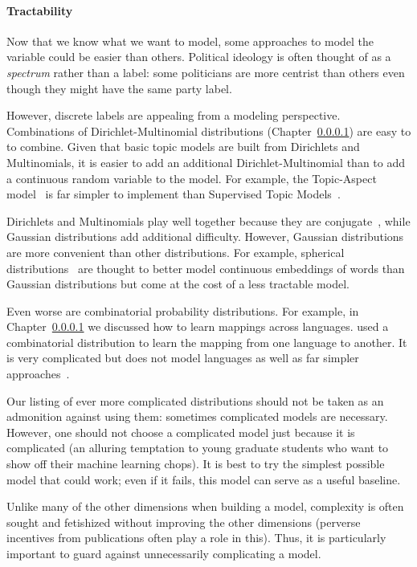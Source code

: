 \paragraph{Tractability}

Now that we know what we want to model, some approaches to model the
variable could be easier than others.  Political ideology is often
thought of as a \emph{spectrum} rather than a label: some politicians
are more centrist than others even though they might have the same
party label.

However, discrete labels are appealing from a modeling perspective.
Combinations of Dirichlet-Multinomial distributions (Chapter~\ref{})
are easy to to combine.  Given that basic topic models are built from
Dirichlets and Multinomials, it is easier to add an additional
Dirichlet-Multinomial than to add a continuous random variable to the
model.  For example, the Topic-Aspect model~\citep{} is far simpler to
implement than Supervised Topic Models~\citep{}.

Dirichlets and Multinomials play well together because they are
conjugate~\citep{}, while Gaussian distributions add additional
difficulty.  However, Gaussian distributions are more convenient than
other distributions.  For example, spherical distributions~\citep{} are thought
to better model continuous embeddings of words than Gaussian
distributions but come at the cost of a less tractable model.

Even worse are combinatorial probability distributions.  For example,
in Chapter~\ref{} we discussed how to learn mappings across
languages.  \citet{} used a combinatorial distribution to learn the
mapping from one language to another.  It is very complicated but
does not model languages as well as far simpler approaches~\citep{}.

Our listing of ever more complicated distributions should not be taken
as an admonition against using them: sometimes complicated models are
necessary.  However, one should not choose a complicated model just
because it is complicated (an alluring temptation to young graduate
students who want to show off their machine learning chops).  It is
best to try the simplest possible model that could work; even if it
fails, this model can serve as a useful baseline.

Unlike many of the other dimensions when building a model, complexity
is often sought and fetishized without improving the other dimensions
(perverse incentives from publications often play a role in this).
Thus, it is particularly important to guard against unnecessarily
complicating a model.


